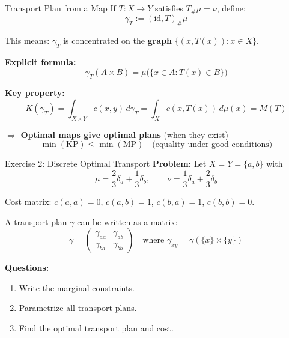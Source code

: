 \documentclass[aspectratio=169]{beamer}
\begin{document}
\begin{frame}{Transport Plan from a Map}
If $T: X \to Y$ satisfies $T_\# \mu = \nu$, define:
\[
\gamma_T := (\text{id}, T)_\# \mu
\]

This means: $\gamma_T$ is concentrated on the \textbf{graph} $\{(x, T(x)) : x \in X\}$.

\vspace{0.3cm}
\textbf{Explicit formula:}
\[
\gamma_T(A \times B) = \mu\bigl(\{x \in A : T(x) \in B\}\bigr)
\]

\vspace{0.3cm}
\textbf{Key property:}
\[
K(\gamma_T) = \int_{X \times Y} c(x,y) \, d\gamma_T = \int_X c(x, T(x)) \, d\mu(x) = M(T)
\]

\vspace{0.3cm}
$\Rightarrow$ \textbf{Optimal maps give optimal plans} (when they exist)
\[
\min(\text{KP}) \leq \min(\text{MP}) \quad \text{(equality under good conditions)}
\]
\end{frame}

\begin{frame}{Exercise 2: Discrete Optimal Transport}
\textbf{Problem:} Let $X = Y = \{a, b\}$ with
\[
\mu = \frac{2}{3}\delta_a + \frac{1}{3}\delta_b, \qquad \nu = \frac{1}{3}\delta_a + \frac{2}{3}\delta_b
\]

Cost matrix: $c(a,a) = 0$, $c(a,b) = 1$, $c(b,a) = 1$, $c(b,b) = 0$.

\vspace{0.3cm}
A transport plan $\gamma$ can be written as a matrix:
\[
\gamma = \begin{pmatrix} \gamma_{aa} & \gamma_{ab} \\ \gamma_{ba} & \gamma_{bb} \end{pmatrix}
\quad \text{where } \gamma_{xy} = \gamma(\{x\} \times \{y\})
\]

\vspace{0.3cm}
\textbf{Questions:}
\begin{enumerate}
    \item[(a)] Write the marginal constraints.
    \item[(b)] Parametrize all transport plans.
    \item[(c)] Find the optimal transport plan and cost.
\end{enumerate}
\end{frame}
\end{document}
